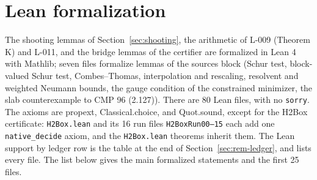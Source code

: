 \section{Lean formalization}\label{app:lean}

The shooting lemmas of Section~\ref{sec:shooting}, the arithmetic of L-009 (Theorem K) and L-011, and the bridge lemmas of the certifier are formalized in Lean 4 with Mathlib; seven files formalize lemmas of the sources block (Schur test, block-valued Schur test, Combes--Thomas, interpolation and rescaling, resolvent and weighted Neumann bounds, the gauge condition of the constrained minimizer, the slab counterexample to CMP 96 (2.127)). There are 80 Lean files, with no \texttt{sorry}. The axioms are propext, Classical.choice, and Quot.sound, except for the H2Box certificate: \texttt{H2Box.lean} and its 16 run files \texttt{H2BoxRun00--15} each add one \texttt{native\_decide} axiom, and the \texttt{H2Box.lean} theorems inherit them. The Lean support by ledger row is the table at the end of Section~\ref{sec:rem-ledger}, and  lists every file. The list below gives the main formalized statements and the first 25 files.

